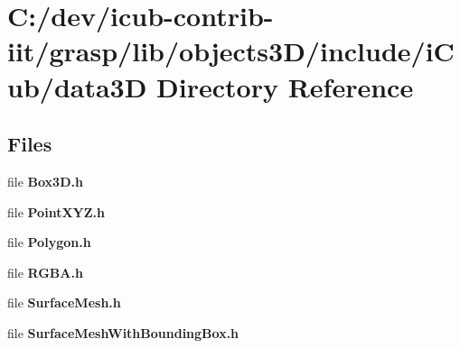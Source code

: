 \section{C\+:/dev/icub-\/contrib-\/iit/grasp/lib/objects3\+D/include/i\+Cub/data3\+D Directory Reference}
\label{dir_8caa9fbf98f851046eeef01768380c9a}
\subsection*{Files}
\begin{DoxyCompactItemize}
\item 
file {\bfseries Box3\+D.\+h}
\item 
file {\bfseries Point\+X\+Y\+Z.\+h}
\item 
file {\bfseries Polygon.\+h}
\item 
file {\bfseries R\+G\+B\+A.\+h}
\item 
file {\bfseries Surface\+Mesh.\+h}
\item 
file {\bfseries Surface\+Mesh\+With\+Bounding\+Box.\+h}
\end{DoxyCompactItemize}
